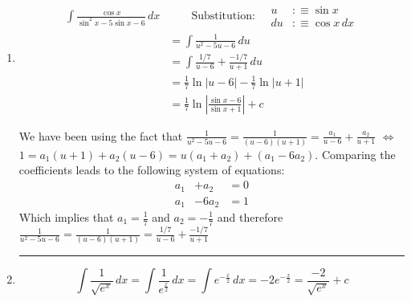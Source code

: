 \begin{enumerate}
  \item
    \begin{equation}
      \begin{aligned}
        \int \frac{\cos x}{\sin^2 x - 5 \sin x - 6} \, dx
        & \qquad
        \text{Substitution:}
        \quad
        \boxed{\begin{aligned}
            u &:\equiv \sin x \\
            du &: \equiv \cos x \, dx
          \end{aligned}
        } \\
        & = \int \frac{1}{u^2-5u-6} \, du \\
        & = \int \frac{1/7}{u-6}+\frac{-1/7}{u+1} \, du \\
        & = \frac{1}{7} \ln |u-6| - \frac{1}{7} \ln |u+1| \\
        & = \frac{1}{7} \ln \left | \frac{ \sin x - 6} {\sin x + 1} \right | + c
      \end{aligned}
    \end{equation}

    We have been using the fact that $\frac{1}{u^2-5u-6}=\frac{1}{(u-6)(u+1)}=\frac{a_1}{u-6}+\frac{a_2}{u+1}$ $\iff$ $1=a_1 (u+1) + a_2(u-6)=u(a_1+a_2)+(a_1-6a_2)$. Comparing the coefficients leads to the following system of equations:
    \begin{equation}
      \begin{aligned}
        a_1 & +   a_2 & = 0 \\
        a_1 & - 6 a_2 & = 1
      \end{aligned}
    \end{equation}
    Which implies that $a_1 = \frac{1}{7}$ and $a_2 = -\frac{1}{7}$ and therefore $\frac{1}{u^2-5u-6}=\frac{1}{(u-6)(u+1)}=\frac{1/7}{u-6}+\frac{-1/7}{u+1}$
    \bigbreak
    \hrule
    \bigbreak

  \item
    \begin{equation}
      \int \frac{1}{\sqrt{e^x}} \,dx
       = \int \frac{1}{e^{\frac{x}{2}}} \, dx
       = \int e^{-\frac{x}{2}} \, dx
       = -2 e^{-\frac{x}{2}} = \frac{-2}{\sqrt{e^x}}+c
    \end{equation}

\end{enumerate}